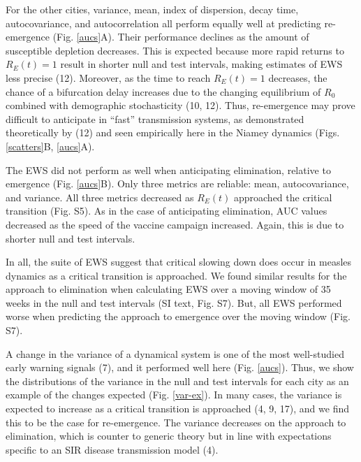 \documentclass[3p]{elsarticle} %
\begin{document}
For the other cities, variance, mean, index of dispersion, decay time,
autocovariance, and autocorrelation all perform equally well at
predicting re-emergence (Fig. \ref{aucs}A). Their performance declines
as the amount of susceptible depletion decreases. This is expected
because more rapid returns to \(R_E(t)=1\) result in shorter null and
test intervals, making estimates of EWS less precise (12). Moreover, as
the time to reach \(R_E(t)=1\) decreases, the chance of a bifurcation
delay increases due to the changing equilibrium of \(R_0\) combined with
demographic stochasticity (10, 12). Thus, re-emergence may prove
difficult to anticipate in ``fast'' transmission systems, as
demonstrated theoretically by (12) and seen empirically here in the
Niamey dynamics (Figs. \ref{scatters}B, \ref{aucs}A).

The EWS did not perform as well when anticipating elimination, relative
to emergence (Fig. \ref{aucs}B). Only three metrics are reliable: mean,
autocovariance, and variance. All three metrics decreased as \(R_E(t)\)
approached the critical transition (Fig. S5). As in the case of
anticipating elimination, AUC values decreased as the speed of the
vaccine campaign increased. Again, this is due to shorter null and test
intervals.

In all, the suite of EWS suggest that critical slowing down does occur
in measles dynamics as a critical transition is approached. We found
similar results for the approach to elimination when calculating EWS
over a moving window of 35 weeks in the null and test intervals (SI
text, Fig. S7). But, all EWS performed worse when predicting the
approach to emergence over the moving window (Fig. S7).

A change in the variance of a dynamical system is one of the most
well-studied early warning signals (7), and it performed well here (Fig.
\ref{aucs}). Thus, we show the distributions of the variance in the null
and test intervals for each city as an example of the changes expected
(Fig. \ref{var-ex}). In many cases, the variance is expected to increase
as a critical transition is approached (4, 9, 17), and we find this to
be the case for re-emergence. The variance decreases on the approach to
elimination, which is counter to generic theory but in line with
expectations specific to an SIR disease transmission model (4).
\end{document}
